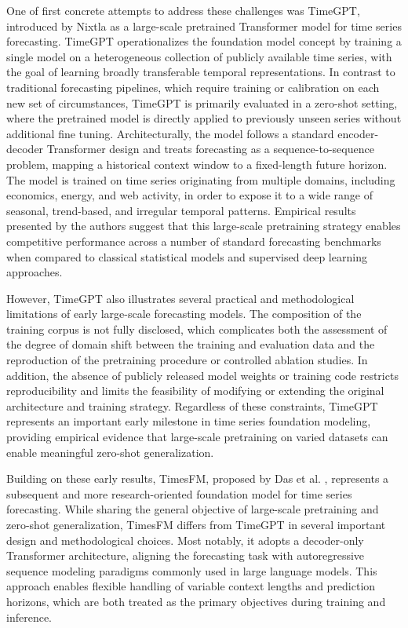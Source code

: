 One of first concrete attempts to address these challenges was TimeGPT, introduced by Nixtla as a large-scale pretrained Transformer model for time series forecasting. TimeGPT operationalizes the foundation model concept by training a single model on a heterogeneous collection of publicly available time series, with the goal of learning broadly transferable temporal representations. In contrast to traditional forecasting pipelines, which require training or calibration on each new set of circumstances, TimeGPT is primarily evaluated in a zero-shot setting, where the pretrained model is directly applied to previously unseen series without additional fine tuning. Architecturally, the model follows a standard encoder-decoder Transformer design and treats forecasting as a sequence-to-sequence problem, mapping a historical context window to a fixed-length future horizon. The model is trained on time series originating from multiple domains, including economics, energy, and web activity, in order to expose it to a wide range of seasonal, trend-based, and irregular temporal patterns. Empirical results presented by the authors suggest that this large-scale pretraining strategy enables competitive performance across a number of standard forecasting benchmarks when compared to classical statistical models and supervised deep learning approaches.

However, TimeGPT also illustrates several practical and methodological limitations of early large-scale forecasting models. The composition of the training corpus is not fully disclosed, which complicates both the assessment of the degree of domain shift between the training and evaluation data and the reproduction of the pretraining procedure or controlled ablation studies. In addition, the absence of publicly released model weights or training code restricts reproducibility and limits the feasibility of modifying or extending the original architecture and training strategy. Regardless of these constraints, TimeGPT represents an important early milestone in time series foundation modeling, providing empirical evidence that large-scale pretraining on varied datasets can enable meaningful zero-shot generalization.

Building on these early results, TimesFM, proposed by Das et al. , represents a subsequent and more research-oriented foundation model for time series forecasting. While sharing the general objective of large-scale pretraining and zero-shot generalization, TimesFM differs from TimeGPT in several important design and methodological choices. Most notably, it adopts a decoder-only Transformer architecture, aligning the forecasting task with autoregressive sequence modeling paradigms commonly used in large language models. This approach enables flexible handling of variable context lengths and prediction horizons, which are both treated as the primary objectives during training and inference.

